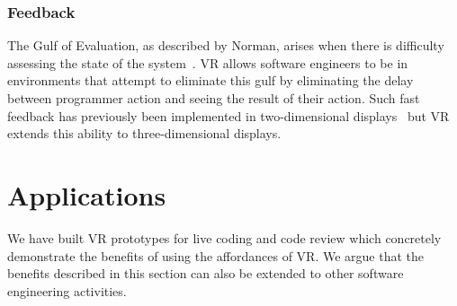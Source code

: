 \documentclass[conference]{IEEEtran}
\begin{document}




\subsubsection{Feedback}
The Gulf of Evaluation, as described by Norman, arises when there is difficulty assessing the state of the system~\cite{Norman:DesignOfEverydayThings}.  VR allows software engineers to be in environments that attempt to eliminate this gulf by eliminating the delay between programmer action and seeing the result of their action. Such fast feedback has previously been implemented in two-dimensional displays~\cite{Burnett:LivenessLevel4} but VR extends this ability to three-dimensional displays.






\section{Applications}

We have built VR prototypes for live coding and code review which concretely demonstrate the benefits of using the affordances of VR.
We argue that the benefits described in this section can also be extended to other software engineering activities.
\end{document}
